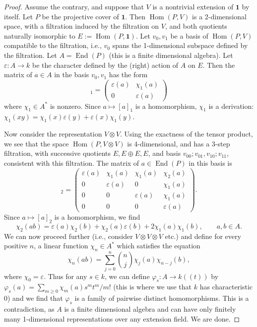 \documentclass[11pt]{article}
\DeclareMathOperator{\Hom}{Hom}
\DeclareMathOperator{\End}{End}
\newcommand{\unit}{\mathbf 1}
\begin{document}
\begin{proof}
Assume the contrary, and suppose that $V$ is a nontrivial extension of
$\unit$ by itself. Let $P$ be the projective cover of $\unit$. Then
$\Hom(P,V)$ is a 2-dimensional space, with a filtration induced by the
filtration on $V$, and both quotients naturally isomorphic to
$E:=\Hom(P,\unit)$. Let $v_0,v_1$ be a basis of $\Hom(P,V)$ compatible
to the filtration, i.e., $v_0$ spans the 1-dimensional subspace defined
by the filtration. Let $A=\End(P)$ (this is a finite dimensional
algebra). Let $\varepsilon:A\to k$ be the character defined by the
(right) action of $A$ on $E$. Then the matrix of $a\in A$ in the basis
$v_0,v_1$ has the form
\begin{equation}
[a]_1=\begin{pmatrix}
\varepsilon(a)&\chi_1(a)\\
0&\varepsilon(a)
\end{pmatrix}
\tag{4.5}
\end{equation}
where $\chi_1\in A^*$ is nonzero. Since $a\mapsto[a]_1$ is a
homomorphism, $\chi_1$ is a derivation:
$\chi_1(xy)=\chi_1(x)\varepsilon(y)+\varepsilon(x)\chi_1(y)$.

Now consider the representation $V\otimes V$. Using the exactness of
the tensor product, we see that the space $\Hom(P,V\otimes V)$ is
4-dimensional, and has a 3-step filtration, with successive quotients
$E,E\oplus E,E$, and basis $v_{00};v_{01},v_{10};v_{11}$, consistent
with this filtration. The matrix of $a\in\End(P)$ in this basis is
\begin{equation}
[a]_2=\begin{pmatrix}
\varepsilon(a)&\chi_1(a)&\chi_1(a)&\chi_2(a)\\
0&\varepsilon(a)&0&\chi_1(a)\\
0&0&\varepsilon(a)&\chi_1(a)\\
0&0&0&\varepsilon(a)
\end{pmatrix}.
\tag{4.6}
\end{equation}
Since $a\mapsto[a]_2$ is a homomorphism, we find
\[
\chi_2(ab)=\varepsilon(a)\chi_2(b)+\chi_2(a)\varepsilon(b)
+2\chi_1(a)\chi_1(b),\qquad a,b\in A.
\]
We can now proceed further (i.e., consider $V\otimes V\otimes V$
etc.) and define for every positive $n$, a linear function
$\chi_n\in A^*$ which satisfies the equation
\[
\chi_n(ab)=\sum_{j=0}^n\binom nj\chi_j(a)\chi_{n-j}(b),
\]
where $\chi_0=\varepsilon$. Thus for any $s\in k$, we can define
$\varphi_s:A\to k((t))$ by
$\varphi_s(a)=\sum_{m\ge0}\chi_m(a)s^mt^m/m!$ (this is where we use
that $k$ has characteristic $0$) and we find that $\varphi_s$ is a
family of pairwise distinct homomorphisms. This is a contradiction,
as $A$ is a finite dimensional algebra and can have only finitely many
1-dimensional representations over any extension field. We are done.
\end{proof}
\end{document}
